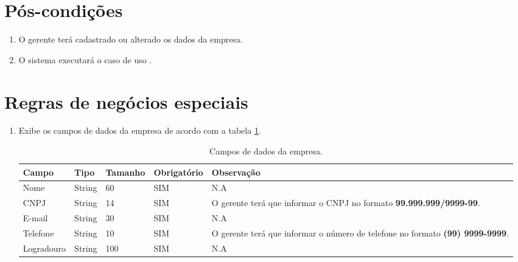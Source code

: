 \section{Pós-condições}

\begin{enumerate}
	\item O gerente terá cadastrado ou alterado os dados da empresa.
	\item O sistema executará o caso de uso .	
\end{enumerate}

\section{Regras de negócios especiais}

\begin{enumerate}[label=RN\arabic*]
	\item Exibe os campos de dados da empresa de acordo com a tabela \ref{uc004_tb_rn1}. \label{uc004_rn:1}
	\begin{table}[htb]
		\ABNTEXfontereduzida
		\caption[Campos de dados da empresa]{Campos de dados da empresa.}
		\label{uc004_tb_rn1}
		\begin{tabular}{|p{3.0cm}|p{2.0cm}|p{1.5cm}|p{2.0cm}|p{5.75cm}|}
			\hline
			\textbf{Campo} & \textbf{Tipo} & \textbf{Tamanho} & \textbf{Obrigatório} & \textbf{Observação}                                                                  \\ \hline
			Nome           & String        & 60               & SIM                  & N.A                                                                                  \\ \hline
			CNPJ           & String        & 14               & SIM                  & O gerente terá que informar o CNPJ no formato \textbf{99.999.999/9999-99}.           \\ \hline
			E-mail         & String        & 30               & SIM                  & N.A                                                                                  \\ \hline
			Telefone       & String        & 10               & SIM                  & O gerente terá que informar o número de telefone no formato \textbf{(99) 9999-9999}. \\ \hline
			Logradouro     & String        & 100              & SIM                  & N.A                                                                                  \\ \hline

\end{tabular}
\end{table}
\end{enumerate}
